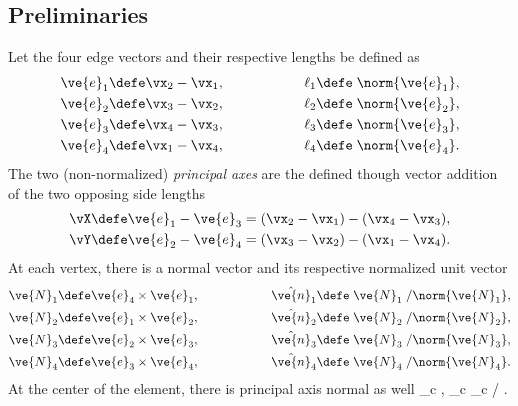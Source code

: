\documentclass[14pt,letterpaper,fleqn]{extreport}
\begin{document}
\subsection{Preliminaries}

Let the four edge vectors and their respective lengths be defined as
\begin{align}
 \ve{e}_1 & \defe \vx_2 - \vx_1, \hspace{2cm} \ell_1 \defe \; \norm{\ve{e}_1}, \\
 \ve{e}_2 & \defe \vx_3 - \vx_2, \hspace{2cm} \ell_2 \defe \; \norm{\ve{e}_2}, \\
 \ve{e}_3 & \defe \vx_4 - \vx_3, \hspace{2cm} \ell_3 \defe \; \norm{\ve{e}_3}, \\
 \ve{e}_4 & \defe \vx_1 - \vx_4, \hspace{2cm} \ell_4 \defe \; \norm{\ve{e}_4}.
\end{align}
%
The two (non-normalized) {\em principal axes} are the defined though vector addition
of the two opposing side lengths
\begin{align}
 \vX & \defe \ve{e}_1 - \ve{e}_3 = (\vx_2 - \vx_1) - (\vx_4 - \vx_3), \\
 \vY & \defe \ve{e}_2 - \ve{e}_4 = (\vx_3 - \vx_2) - (\vx_1 - \vx_4).
\end{align}
%
At each vertex, there is a normal vector and its respective normalized unit vector
\begin{align}
 \ve{N}_1 & \defe \ve{e}_4 \times \ve{e}_1, \hspace{2cm} \hat{\ve{n}}_1 \defe \; \ve{N}_1 \; / \norm{\ve{N}_1}, \\
 \ve{N}_2 & \defe \ve{e}_1 \times \ve{e}_2, \hspace{2cm} \hat{\ve{n}}_2 \defe \; \ve{N}_2 \; / \norm{\ve{N}_2}, \\
 \ve{N}_3 & \defe \ve{e}_2 \times \ve{e}_3, \hspace{2cm} \hat{\ve{n}}_3 \defe \; \ve{N}_3 \; / \norm{\ve{N}_3}, \\
 \ve{N}_4 & \defe \ve{e}_3 \times \ve{e}_4, \hspace{2cm} \hat{\ve{n}}_4 \defe \; \ve{N}_4 \; / \norm{\ve{N}_4}.
\end{align}
%
At the center of the element, there is principal axis normal as well
\be
 _c   \vX \times \vY, \hspace{2cm} _c  \; _c \; / .
\ee
\end{document}
